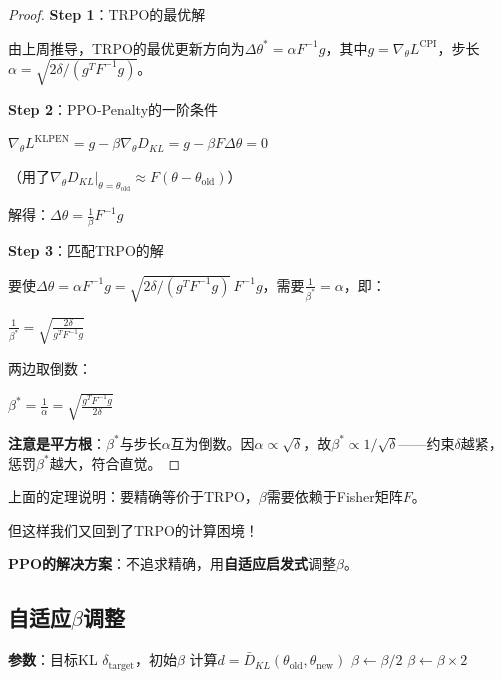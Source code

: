 \documentclass[11pt,a4paper]{article}
\theoremstyle{definition}
\begin{document}
\begin{proof}
\textbf{Step 1}：TRPO的最优解

由上周推导，TRPO的最优更新方向为$\Delta\theta^* = \alpha F^{-1} g$，其中$g = \nabla_\theta L^{\text{CPI}}$，步长$\alpha = \sqrt{2\delta / (g^T F^{-1} g)}$。

\textbf{Step 2}：PPO-Penalty的一阶条件

$\nabla_\theta L^{\text{KLPEN}} = g - \beta \nabla_\theta D_{KL} = g - \beta F \Delta\theta = 0$

（用了$\nabla_\theta D_{KL}|_{\theta=\theta_{\text{old}}} \approx F(\theta - \theta_{\text{old}})$）

解得：$\Delta\theta = \frac{1}{\beta} F^{-1} g$

\textbf{Step 3}：匹配TRPO的解

要使$\Delta\theta = \alpha F^{-1} g = \sqrt{2\delta / (g^T F^{-1} g)}\, F^{-1} g$，需要$\frac{1}{\beta^*} = \alpha$，即：

$\frac{1}{\beta^*} = \sqrt{\frac{2\delta}{g^T F^{-1} g}}$

两边取倒数：

$\beta^* = \frac{1}{\alpha} = \sqrt{\frac{g^T F^{-1} g}{2\delta}}$

\textbf{注意是平方根}：$\beta^*$与步长$\alpha$互为倒数。因$\alpha\propto\sqrt{\delta}$，故$\beta^*\propto1/\sqrt{\delta}$——约束$\delta$越紧，惩罚$\beta^*$越大，符合直觉。
\end{proof}

\begin{surprising}
上面的定理说明：要精确等价于TRPO，$\beta$需要依赖于Fisher矩阵$F$。

但这样我们又回到了TRPO的计算困境！

\textbf{PPO的解决方案}：不追求精确，用\textbf{自适应启发式}调整$\beta$。
\end{surprising}

\subsection{自适应$\beta$调整}

\begin{algorithm}[H]
\caption{PPO-Penalty的$\beta$更新}
\begin{algorithmic}[1]
\State \textbf{参数}：目标KL $\delta_{\text{target}}$，初始$\beta$
    \State 计算$d = \bar{D}_{KL}(\theta_{\text{old}}, \theta_{\text{new}})$
     
        \State $\beta \leftarrow \beta / 2$
     
        \State $\beta \leftarrow \beta \times 2$
    \EndIf
\EndFor
\end{algorithmic}
\end{algorithm}
\end{document}
